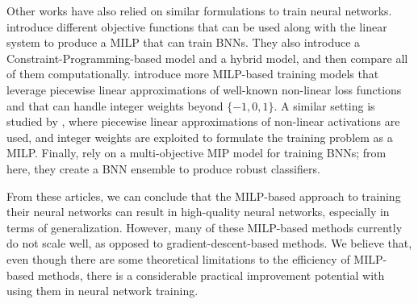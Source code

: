 Other works have also relied on similar formulations to train neural networks. \cite{icarte2019training} introduce different objective functions that can be used along
with the linear system to produce a MILP that can train BNNs. They also introduce a Constraint-Programming-based model and a hybrid model, and then compare all of them computationally. \cite{thorbjarnarson2020training} introduce more MILP-based training models that leverage piecewise linear approximations of well-known non-linear loss functions and that can handle integer weights beyond $\{-1,0,1\}$. A similar setting is studied by \cite{sildir2022mixed}, where piecewise linear approximations of non-linear activations are used, and integer weights are exploited to formulate the training problem as a MILP. Finally,  \cite{bernardelli2022bemi} rely on a multi-objective MIP model for training BNNs; from here, they create a BNN ensemble to produce robust classifiers. 

From these articles, we can conclude that the MILP-based approach to training their neural networks can result in high-quality neural networks, especially in terms of generalization. However, many of these MILP-based methods currently do not scale well, as opposed to gradient-descent-based methods. We believe that, even though there are some theoretical limitations to the efficiency of MILP-based methods, there is a considerable practical improvement potential with using them in neural network training.



